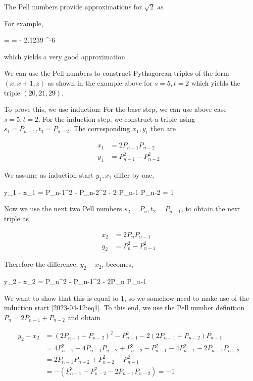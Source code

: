 The Pell numbers provide approximations for $\sqrt{2}$ as

\bee
{} \approx {}
\eee

For example, 

\bee
{} =   =  - 2.1239 ^{-6}
\eee

which yields a very good approximation.

We can use the Pell numbers to construct Pythagorean triples of the form $(x, x+1, z)$ as shown in the example above for $s = 5, t=2$ which yields the triple $(20, 21, 29)$.

To prove this, we use induction: For the base step, we can use above case $s = 5, t=2$. For the induction step, we construct a triple using $s_1 = P_{n-1}, t_1 = P_{n-2}$. The corresponding $x_1, y_1$ then are

\begin{align*}
    x_1 &= 2P_{n-1} P_{n-2} \\
    y_1 &= P_{n-1}^2 - P_{n-2}^2
\end{align*}

We assume as induction start $y_1, x_1$ differ by one,

\be\label{2023-04-12:eq1}
y_1 - x_1 = P_{n-1}^2 - P_{n-2}^2 - 2 P_{n-1} P_{n-2} = 1
\ee

Now we use the next two Pell numbers $s_2 = P_{n}, t_2 = P_{n-1}$, to obtain the next triple as

\begin{align*}
    x_2 &= 2P_{n} P_{n-1} \\
    y_2 &= P_{n}^2 - P_{n-1}^2
\end{align*}

Therefore the difference, $y_2 - x_2$, becomes,

\bee
    y_2 - x_2 = P_{n}^2 - P_{n-1}^2 - 2P_{n} P_{n-1}
\eee

We want to show that this is equal to $1$, so we somehow need to make use of the induction start \ref{2023-04-12:eq1}. To this end, we use the Pell number definition $P_n = 2 P_{n-1} + P_{n-2}$ and obtain

\begin{align*}
    y_2 - x_2 &= (2 P_{n-1} + P_{n-2})^2 - P_{n-1}^2 - 2(2 P_{n-1} + P_{n-2}) P_{n-1} \\
    &= 4 P_{n-1}^2 + 4 P_{n-1} P_{n-2} + P_{n-2}^2 - P_{n-1}^2 - 4 P_{n-1}^2 - 2 P_{n-1} P_{n-2} \\
    &= 2 P_{n-1} P_{n-2} + P_{n-2}^2 - P_{n-1}^2 \\
    &= - (P_{n-1}^2 - P_{n-2}^2 - 2 P_{n-1} P_{n-2} ) = -1
\end{align*}

